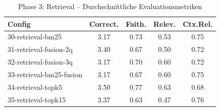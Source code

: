 \begin{table}[H]
\centering
\small
\begin{tabular}{lcccc}
\toprule
Config & Correct. & Faith. & Relev. & Ctx.Rel. \\
\midrule
30-retrieval-bm25 & 3.17 & 0.73 & 0.53 & 0.75 \\
31-retrieval-fusion-2q & 3.40 & 0.67 & 0.50 & 0.72 \\
32-retrieval-fusion-3q & 3.17 & 0.70 & 0.60 & 0.72 \\
33-retrieval-bm25-fusion & 3.17 & 0.67 & 0.60 & 0.75 \\
34-retrieval-topk5 & 3.50 & 0.77 & 0.63 & 0.68 \\
35-retrieval-topk15 & 3.37 & 0.63 & 0.47 & 0.76 \\
\bottomrule
\end{tabular}
\caption{Phase 3: Retrieval -- Durchschnittliche Evaluationsmetriken}
\label{tab:phase3_eval}
\end{table}